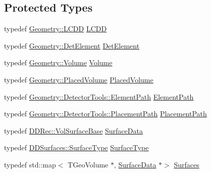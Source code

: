 \subsection*{Protected Types}
\begin{DoxyCompactItemize}
\item 
typedef \hyperlink{class_d_d4hep_1_1_geometry_1_1_l_c_d_d}{Geometry\+::\+L\+C\+DD} \hyperlink{class_d_d4hep_1_1_surface_installer_a155d137884c31b56d13fb58846e562a3}{L\+C\+DD}
\item 
typedef \hyperlink{class_d_d4hep_1_1_geometry_1_1_det_element}{Geometry\+::\+Det\+Element} \hyperlink{class_d_d4hep_1_1_surface_installer_ab88f41bd9efd54b4b67baee892bfa926}{Det\+Element}
\item 
typedef \hyperlink{class_d_d4hep_1_1_geometry_1_1_volume}{Geometry\+::\+Volume} \hyperlink{class_d_d4hep_1_1_surface_installer_a32a727cbf3cfca5204b7eaf344a5304f}{Volume}
\item 
typedef \hyperlink{class_d_d4hep_1_1_geometry_1_1_placed_volume}{Geometry\+::\+Placed\+Volume} \hyperlink{class_d_d4hep_1_1_surface_installer_a48fe5565640dc158344c63c2fbb9c506}{Placed\+Volume}
\item 
typedef \hyperlink{namespace_d_d4hep_1_1_geometry_1_1_detector_tools_a57c8f37a975258fd84676a69e74c56ab}{Geometry\+::\+Detector\+Tools\+::\+Element\+Path} \hyperlink{class_d_d4hep_1_1_surface_installer_a731a72c192bdf217f206f0a04ff9dea7}{Element\+Path}
\item 
typedef \hyperlink{namespace_d_d4hep_1_1_geometry_1_1_detector_tools_a6cc33285199e04dd336a33e6e62925e6}{Geometry\+::\+Detector\+Tools\+::\+Placement\+Path} \hyperlink{class_d_d4hep_1_1_surface_installer_a73ea611f3129bed899d4282cd126c4e5}{Placement\+Path}
\item 
typedef \hyperlink{class_d_d4hep_1_1_d_d_rec_1_1_vol_surface_base}{D\+D\+Rec\+::\+Vol\+Surface\+Base} \hyperlink{class_d_d4hep_1_1_surface_installer_adf9b9c7ac69d57dd6e262891e925be3c}{Surface\+Data}
\item 
typedef \hyperlink{class_d_d_surfaces_1_1_surface_type}{D\+D\+Surfaces\+::\+Surface\+Type} \hyperlink{class_d_d4hep_1_1_surface_installer_a8989d1da18081ccd8afbe70a21d0c918}{Surface\+Type}
\item 
typedef std\+::map$<$ T\+Geo\+Volume $\ast$, \hyperlink{class_d_d4hep_1_1_surface_installer_adf9b9c7ac69d57dd6e262891e925be3c}{Surface\+Data} $\ast$$>$ \hyperlink{class_d_d4hep_1_1_surface_installer_a16346209b86955ff4a4a380c3ce1bcd2}{Surfaces}
\end{DoxyCompactItemize}
